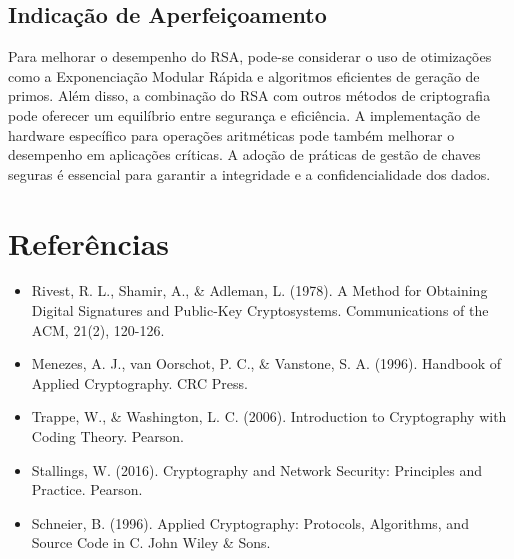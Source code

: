 \documentclass[a4paper,12pt]{article}
\begin{document}
\subsection*{Indicação de Aperfeiçoamento}
Para melhorar o desempenho do RSA, pode-se considerar o uso de otimizações como a Exponenciação Modular Rápida e algoritmos eficientes de geração de primos. Além disso, a combinação do RSA com outros métodos de criptografia pode oferecer um equilíbrio entre segurança e eficiência. A implementação de hardware específico para operações aritméticas pode também melhorar o desempenho em aplicações críticas. A adoção de práticas de gestão de chaves seguras é essencial para garantir a integridade e a confidencialidade dos dados.

\section*{Referências}
\begin{itemize}
    \item Rivest, R. L., Shamir, A., \& Adleman, L. (1978). A Method for Obtaining Digital Signatures and Public-Key Cryptosystems. Communications of the ACM, 21(2), 120-126.
    \item Menezes, A. J., van Oorschot, P. C., \& Vanstone, S. A. (1996). Handbook of Applied Cryptography. CRC Press.
    \item Trappe, W., \& Washington, L. C. (2006). Introduction to Cryptography with Coding Theory. Pearson.
    \item Stallings, W. (2016). Cryptography and Network Security: Principles and Practice. Pearson.
    \item Schneier, B. (1996). Applied Cryptography: Protocols, Algorithms, and Source Code in C. John Wiley \& Sons.
\end{itemize}
\end{document}

